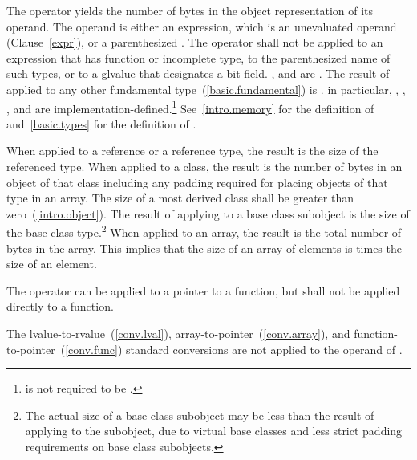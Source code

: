 \pnum
{}%
%
%
The  operator yields the number of bytes in the object
representation of its operand. The operand is either an expression,
which is an unevaluated operand (Clause~\ref{expr}), or a parenthesized
.
%
The  operator shall not be applied to an expression that
has function or incomplete type, 
to the parenthesized name of such
types, or to a glvalue that designates a bit-field.
,  and
 are . The result of
 applied to any other fundamental
type~(\ref{basic.fundamental}) is .
\enternote 
in particular, , ,
, and  are
implementation-defined.\footnote{ is not required to be .}
\exitnote 
\enternote 
See~\ref{intro.memory} for the definition of 
and~\ref{basic.types} for the definition of .
\exitnote 

\pnum
{}%
When applied to a reference or a reference type, the result is the size
of the referenced type.
%
When applied to a class, the result is the number of bytes in an object
of that class including any padding required for placing objects of that
type in an array. The size of a most derived class shall be greater than
zero~(\ref{intro.object}). The result of applying  to a
base class subobject is the size of the base class type.\footnote{The actual
size of a base class subobject may be less than the result of
applying  to the subobject, due to virtual base classes
and less strict padding requirements on base class subobjects.}
%
When applied to an array, the result is the total number of bytes in the
array. This implies that the size of an array of  elements is
 times the size of an element.

\pnum
The  operator can be applied to a pointer to a function,
but shall not be applied directly to a function.

\pnum
The lvalue-to-rvalue~(\ref{conv.lval}),
array-to-pointer~(\ref{conv.array}), and
function-to-pointer~(\ref{conv.func}) standard conversions are not
applied to the operand of .

